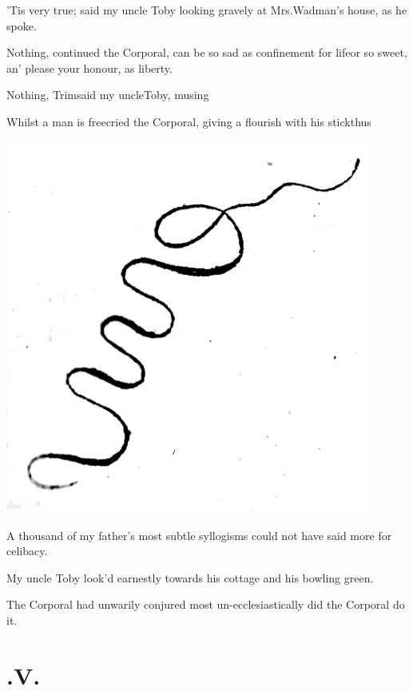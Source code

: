 \documentclass{article}
\begin{document}
’Tis very true; said my uncle Toby looking gravely
at Mrs.\@ Wadman’s house, as he spoke.

Nothing, continued the Corporal, can be so sad as confinement
for life\tsk or so sweet, an’ please your honour, as
liberty.

\newpage
Nothing, Trim\tsh said my uncle\break Toby, musing\tsh


Whilst a man is free\tsk cried the Corporal, giving a flourish with his
stick\break thus\tsh

\vfill
\centerline{\includegraphics[width=0.9\textwidth]{flourish.png}}
\vfill

\newpage
A thousand of my father’s most subtle syllogisms could not have said more
for celibacy.


My uncle Toby look’d earnestly towards his cottage
and his bowling green.

The Corporal had unwarily conjured
most un-ecclesiastically did the Corporal do it.

\newpage
\section{.\enspace V.}
\end{document}
